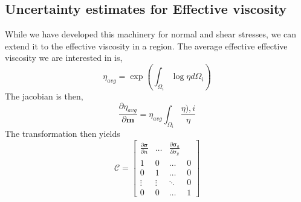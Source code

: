 \documentclass[12pt]{article}
\newcommand{\mm}{{\ensuremath{\boldsymbol{m}}}}
\newcommand{\ssigma}{{\ensuremath{\boldsymbol{\sigma}}}}
\begin{document}
\subsection*{Uncertainty estimates for Effective viscosity}
While we have developed this machinery for normal and shear stresses, we can extend it to the effective viscosity in a region. The average effective effective viscosity we are interested in is,
\begin{equation}
 \eta_{avg} = \exp(\int_{\Omega_i} \log \eta d\Omega_i)
 \end{equation}
The jacobian is then,
\begin{equation}
\frac{\partial \eta_{avg}}{\partial \mm} = \eta_{avg}\int_{\Omega_i} \frac{\eta){,i}}{\eta}
\end{equation}
The transformation then yields 
\begin{equation}
\mathcal C = 
\begin{bmatrix}
\frac{\partial \ssigma}{\partial n} & \dots & \frac{\partial \ssigma_{a}}{\partial \sigma_y} \\
1 &  0 & \dots & 0\\
0 & 1 & \dots & 0 \\
\vdots & \vdots & \ddots  & 0 \\
0 &0 & \dots & 1 

\end{bmatrix}
\end{equation}


\end{document}

